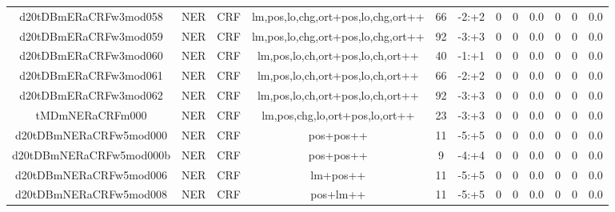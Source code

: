 \documentclass[a4paper]{article}
\begin{document}
\begin{landscape}
\begin{center}
\begin{tabular}{ |c|c|c|c|c|c|c|c|c|c|c|c|}
 	\small{ d20tDBmERaCRFw3mod058 } & \small{ NER} & \small{  CRF }  & lm,pos,lo,chg,ort+pos,lo,chg,ort++  &  66 &  \small{  -2:+2 }  &  0 & 0 & 0.0  &  0 & 0 & 0.0 \\
 	

 
 	
 	\small{ d20tDBmERaCRFw3mod059 } & \small{ NER} & \small{  CRF }  & lm,pos,lo,chg,ort+pos,lo,chg,ort++  &  92 &  \small{  -3:+3 }  &  0 & 0 & 0.0  &  0 & 0 & 0.0 \\
 	

 
 	
 	\small{ d20tDBmERaCRFw3mod060 } & \small{ NER} & \small{  CRF }  & lm,pos,lo,ch,ort+pos,lo,ch,ort++  &  40 &  \small{  -1:+1 }  &  0 & 0 & 0.0  &  0 & 0 & 0.0 \\
 	

 
 	
 	\small{ d20tDBmERaCRFw3mod061 } & \small{ NER} & \small{  CRF }  & lm,pos,lo,ch,ort+pos,lo,ch,ort++  &  66 &  \small{  -2:+2 }  &  0 & 0 & 0.0  &  0 & 0 & 0.0 \\
 	

 
 	
 	\small{ d20tDBmERaCRFw3mod062 } & \small{ NER} & \small{  CRF }  & lm,pos,lo,ch,ort+pos,lo,ch,ort++  &  92 &  \small{  -3:+3 }  &  0 & 0 & 0.0  &  0 & 0 & 0.0 \\
 	

 
 	
 	\small{ tMDmNERaCRFm000 } & \small{ NER} & \small{  CRF }  & lm,pos,chg,lo,ort+pos,lo,ort++  &  23 &  \small{  -3:+3 }  &  0 & 0 & 0.0  &  0 & 0 & 0.0 \\
 	

 
 	
 	\small{ d20tDBmNERaCRFw5mod000 } & \small{ NER} & \small{  CRF }  & pos+pos++  &  11 &  \small{  -5:+5 }  &  0 & 0 & 0.0  &  0 & 0 & 0.0 \\
 	

 
 	
 	\small{ d20tDBmNERaCRFw5mod000b } & \small{ NER} & \small{  CRF }  & pos+pos++  &  9 &  \small{  -4:+4 }  &  0 & 0 & 0.0  &  0 & 0 & 0.0 \\
 	

 
 	
 	\small{ d20tDBmNERaCRFw5mod006 } & \small{ NER} & \small{  CRF }  & lm+pos++  &  11 &  \small{  -5:+5 }  &  0 & 0 & 0.0  &  0 & 0 & 0.0 \\
 	

 
 	
 	\small{ d20tDBmNERaCRFw5mod008 } & \small{ NER} & \small{  CRF }  & pos+lm++  &  11 &  \small{  -5:+5 }  &  0 & 0 & 0.0  &  0 & 0 & 0.0 \\
 	


\end{tabular}
\end{center}
\end{landscape}
\end{document}
